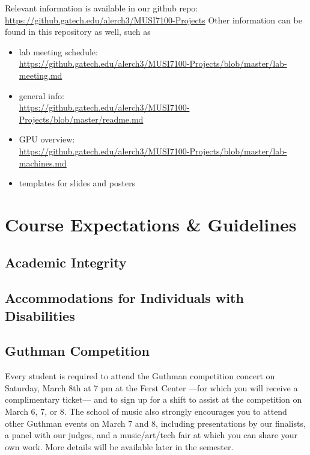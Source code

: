 \documentclass[letterpaper,oneside,10pt]{scrartcl}
\begin{document}
    Relevant information is available in our github repo: \url{https://github.gatech.edu/alerch3/MUSI7100-Projects}
    Other information can be found in this repository as well, such as
    \begin{itemize}
        \item   lab meeting schedule:\\ \url{https://github.gatech.edu/alerch3/MUSI7100-Projects/blob/master/lab-meeting.md}
        \item   general info:\\ \url{https://github.gatech.edu/alerch3/MUSI7100-Projects/blob/master/readme.md}
        \item   GPU overview:\\ \url{https://github.gatech.edu/alerch3/MUSI7100-Projects/blob/master/lab-machines.md}
        \item   templates for slides and posters
    \end{itemize}
    

    
\section{Course Expectations \& Guidelines}
    
    \subsection{Academic Integrity}
        

    \subsection{Accommodations for Individuals with Disabilities}
        
        

    \subsection{Guthman Competition}
        Every student is required to attend the Guthman competition concert on Saturday, March 8th at 7 pm at the Ferst Center ---for which you will receive a complimentary ticket--- and to sign up for a shift to assist at the competition on March 6, 7, or 8. The school of music also strongly encourages you to attend other Guthman events on March 7 and 8, including presentations by our finalists, a panel with our judges, and a music/art/tech fair at which you can share your own work. More details will be available later in the semester.
        
\end{document}
